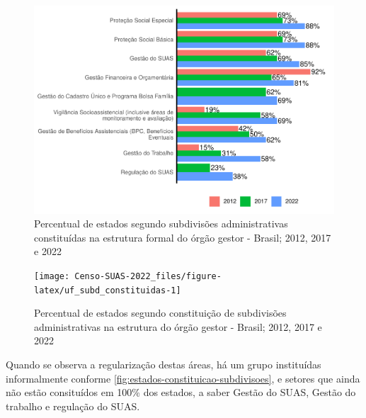 \documentclass[
  brazilian]{report}
\begin{document}
\begin{figure}
\includegraphics{Censo-SUAS-2022_files/figure-latex/uf_subd-1} \caption[Percentual de estados segundo subdivisões administrativas constituídas na estrutura formal do órgão gestor - Brasil]{Percentual de estados segundo subdivisões administrativas constituídas na estrutura formal do órgão gestor - Brasil; 2012, 2017 e 2022}\label{fig:uf_subd}
\end{figure}

\begin{figure}
\texttt{[image: Censo-SUAS-2022\_files/figure-latex/uf\_subd\_constituidas-1]} \caption[Percentual de estados segundo constituição de subdivisões administrativas na estrutura do órgão gestor - Brasil]{Percentual de estados segundo constituição de subdivisões administrativas na estrutura do órgão gestor - Brasil; 2012, 2017 e 2022}\label{fig:uf_subd_constituidas}
\end{figure}

Quando se observa a regularização destas áreas, há um grupo instituídas
informalmente conforme \cref{fig:estados-constituicao-subdivisoes}, e
setores que ainda não estão consituídos em 100\% dos estados, a saber
Gestão do SUAS, Gestão do trabalho e regulação do SUAS.
\end{document}
